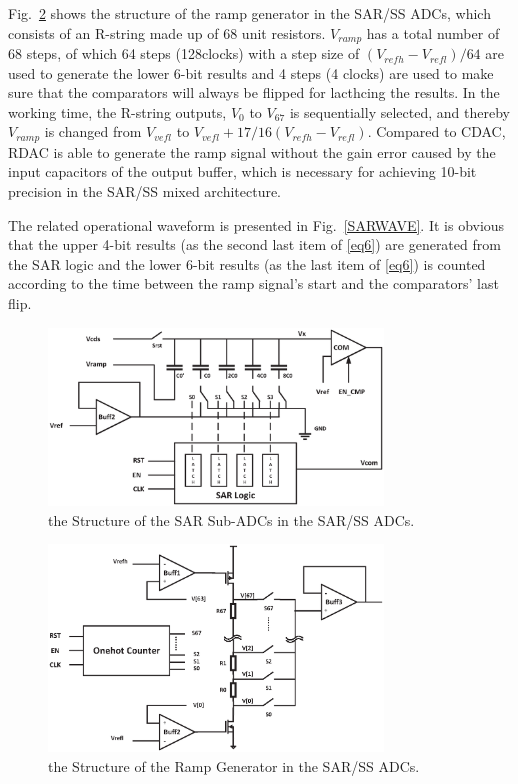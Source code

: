 \documentclass[conference]{IEEEtran}
\begin{document}
Fig.~\ref{RRAMP} shows the structure of the ramp generator in the SAR/SS ADCs, which consists of an R-string made up of 68 unit resistors. $V_{ramp}$ has a total number of 68 steps,
of which 64 steps (128clocks) with a step size of $(V_{refh}-V_{refl})/64$ are used to generate the lower 6-bit results and 4 steps (4 clocks) are used to make sure that the comparators 
will always be flipped for lacthcing the results. In the working time, the R-string outputs, $V_{0}$ to $V_{67}$ is sequentially selected, and thereby $V_{ramp}$ is changed 
from $V_{vefl}$ to $V_{vefl}+17/16(V_{refh}-V_{refl})$. Compared to CDAC, RDAC is able to generate the ramp signal without the gain error caused by the input capacitors of the output buffer, 
which is necessary for achieving 10-bit precision in the SAR/SS mixed architecture.

The related operational waveform is presented in Fig.~\ref{SARWAVE}. It is obvious that the upper 4-bit results (as the second last item of \eqref{eq6}) are generated from the SAR logic and 
the lower 6-bit results (as the last item of \eqref{eq6}) is counted according to the time between the ramp signal’s start and the comparators’ last flip. 
\begin{figure}[htbp]
	\centerline{\includegraphics[width=3.5in]{./Figures/SAR.eps}}
	\caption{the Structure of the SAR Sub-ADCs in the SAR/SS ADCs.}
	\label{SAR}
\end{figure}

\begin{figure}[htbp] 
	\centerline{\includegraphics[width=3.5in]{./Figures/RRAMP.eps}}
	\caption{the Structure of the Ramp Generator in the SAR/SS ADCs.}
	\label{RRAMP}
\end{figure} 
\end{document}
